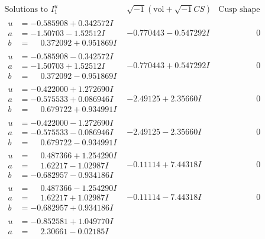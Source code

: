 \documentclass[1p]{elsarticle_modified}
\theoremstyle{definition}
\newcommand{\I}{\sqrt{-1}}
\begin{document}
$$\begin{array}{c|c|c}
\text{Solutions to }I^u_{1}& \I (\text{vol} + \sqrt{-1}CS) & \text{Cusp shape}\\
 \hline 
\begin{aligned}
u &= -0.585908 + 0.342572 I \\
a &= -1.50703 - 1.52512 I \\
b &= \phantom{-}0.372092 + 0.951869 I\end{aligned}
 & -0.770443 - 0.547292 I & \phantom{-0.000000 } 0 \\ \hline\begin{aligned}
u &= -0.585908 - 0.342572 I \\
a &= -1.50703 + 1.52512 I \\
b &= \phantom{-}0.372092 - 0.951869 I\end{aligned}
 & -0.770443 + 0.547292 I & \phantom{-0.000000 } 0 \\ \hline\begin{aligned}
u &= -0.422000 + 1.272690 I \\
a &= -0.575533 + 0.086946 I \\
b &= \phantom{-}0.679722 + 0.934991 I\end{aligned}
 & -2.49125 + 2.35660 I & \phantom{-0.000000 } 0 \\ \hline\begin{aligned}
u &= -0.422000 - 1.272690 I \\
a &= -0.575533 - 0.086946 I \\
b &= \phantom{-}0.679722 - 0.934991 I\end{aligned}
 & -2.49125 - 2.35660 I & \phantom{-0.000000 } 0 \\ \hline\begin{aligned}
u &= \phantom{-}0.487366 + 1.254290 I \\
a &= \phantom{-}1.62217 - 1.02987 I \\
b &= -0.682957 - 0.934186 I\end{aligned}
 & -0.11114 + 7.44318 I & \phantom{-0.000000 } 0 \\ \hline\begin{aligned}
u &= \phantom{-}0.487366 - 1.254290 I \\
a &= \phantom{-}1.62217 + 1.02987 I \\
b &= -0.682957 + 0.934186 I\end{aligned}
 & -0.11114 - 7.44318 I & \phantom{-0.000000 } 0 \\ \hline\begin{aligned}
u &= -0.852581 + 1.049770 I \\
a &= \phantom{-}2.30661 - 0.02185 I \\

\end{aligned}
\end{array}$$
\end{document}
